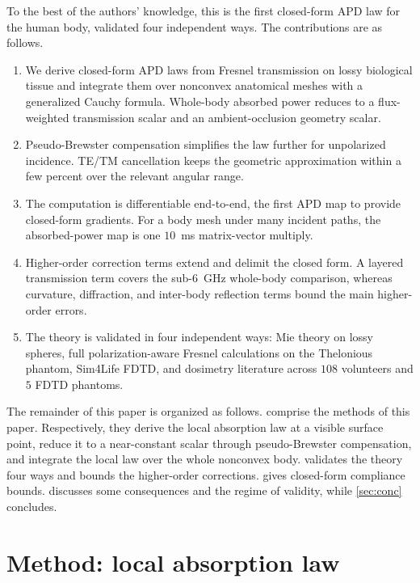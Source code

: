 \documentclass[journal,twocolumn,10pt]{IEEEtran}
\theoremstyle{plain}
\begin{document}
To the best of the authors' knowledge, this is the first closed-form
\gls{APD} law for the human body, validated four independent ways. The
contributions are as follows.
\begin{enumerate}
  \item We derive closed-form \gls{APD} laws from Fresnel transmission
  on lossy biological tissue and integrate them over nonconvex
  anatomical meshes with a generalized Cauchy formula. Whole-body
  absorbed power reduces to a flux-weighted transmission scalar and an
  ambient-occlusion geometry scalar.

  \item Pseudo-Brewster compensation simplifies the law further for
  unpolarized incidence. \gls{TE}/\gls{TM} cancellation keeps the
  geometric approximation within a few percent over the relevant
  angular range.

  \item The computation is differentiable end-to-end, the first
  \gls{APD} map to provide closed-form gradients. For a body mesh
  under many incident paths, the absorbed-power map is one $10$~ms
  matrix-vector multiply.

  \item Higher-order correction terms extend and delimit the closed
  form. A layered transmission term covers the sub-6~GHz whole-body
  comparison, whereas curvature, diffraction, and inter-body reflection
  terms bound the main higher-order errors.

  \item The theory is validated in four independent ways: Mie theory
  on lossy spheres, full polarization-aware Fresnel calculations on
  the Thelonious phantom, Sim4Life FDTD, and dosimetry literature
  across $108$ volunteers and $5$ FDTD phantoms.
\end{enumerate}

The remainder of this paper is organized as follows.
 comprise the methods of this paper.
Respectively, they derive the local absorption law at a visible
surface point, reduce it to a near-constant scalar through
pseudo-Brewster compensation, and integrate the local law over the
whole nonconvex body.  validates the theory four ways
and bounds the higher-order corrections.  gives
closed-form compliance bounds.  discusses some
consequences and the regime of validity, while \cref{sec:conc}
concludes.

\section{Method: local absorption law}\label{sec:law}
\end{document}
